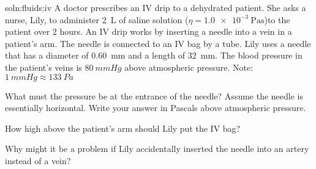 {{\begin{problemParts}{soln:fluids:iv}{\label{prob:fluids:iv} A doctor prescribes an IV drip to a dehydrated patient. She asks a nurse, Lily, to administer \SI{2}{L} of saline solution ($\eta=\SI{1.0e-3}{\pascal\second}$)to the patient over 2 hours. An IV drip works by inserting a needle into a vein in a patient's arm. The needle is connected to an IV bag by a tube. Lily uses a needle that has a diameter of \SI{0.60}{mm} and a length of \SI{32}{mm}. The blood pressure in the patient's veins is $\SI{80}{mm Hg}$ above atmospheric pressure. Note: $\SI{1}{mm Hg}\approx \SI{133}{Pa}$} 
\item What must the pressure be at the entrance of the needle? Assume the needle is essentially horizontal. Write your answer in Pascals above atmospheric pressure.
\item How high above the patient's arm should Lily put the IV bag?
\item Why might it be a problem if Lily accidentally inserted the needle into an artery instead of a vein?
\end{problemParts}

\newpage
}}
